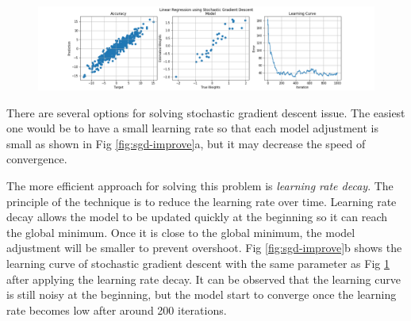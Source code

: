 \documentclass{article}
\begin{document}
\begin{figure}[H]
\begin{center}
\includegraphics[scale=0.3]{SGD.png}
\label{fig:sgd}
\end{center}
\end{figure}

There are several options for solving stochastic gradient descent issue. The easiest one would be to have a small learning rate so that each model adjustment is small as shown in Fig \ref{fig:sgd-improve}a, but it may decrease the speed of convergence.  

The more efficient approach for solving this problem is \textit{learning rate decay}. The principle of the technique is to reduce the learning rate over time. Learning rate decay allows the model to be updated quickly at the beginning so it can reach the global minimum. Once it is close to the global minimum, the model adjustment will be smaller to prevent overshoot. Fig \ref{fig:sgd-improve}b shows the learning curve of stochastic gradient descent with the same parameter as Fig \ref{fig:sgd} after applying the learning rate decay. It can be observed that the learning curve is still noisy at the beginning, but the model start to converge once the learning rate becomes low after around 200 iterations. 
\end{document}
